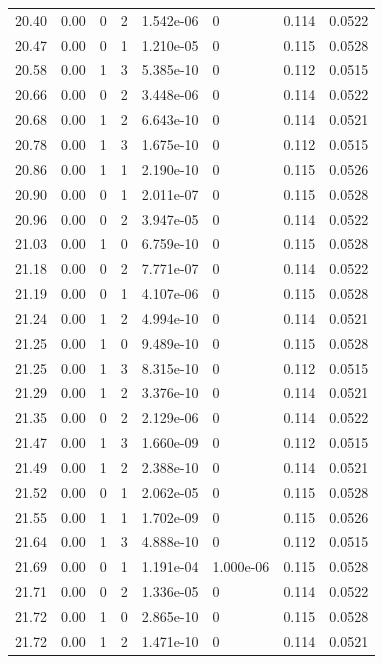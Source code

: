 \documentclass[preview]{standalone}
\begin{document}
{{{{{{{{\begin{tabular}{L{1.2cm}C{1.2cm} C{0.3cm}C{0.5cm} C{1.4cm}C{1.4cm} C{1.4cm}C{1.4cm}}
  20.40  &  0.00  & 0     &  2 &  1.542e-06  & 0  & 0.114 &  0.0522   \\ 
  20.47  &  0.00  & 0     &  1 &  1.210e-05  & 0  & 0.115 &  0.0528   \\ 
  20.58  &  0.00  & 1     &  3 &  5.385e-10  & 0  & 0.112 &  0.0515   \\ 
  20.66  &  0.00  & 0     &  2 &  3.448e-06  & 0  & 0.114 &  0.0522   \\ 
  20.68  &  0.00  & 1     &  2 &  6.643e-10  & 0  & 0.114 &  0.0521   \\ 
  20.78  &  0.00  & 1     &  3 &  1.675e-10  & 0  & 0.112 &  0.0515   \\ 
  20.86  &  0.00  & 1     &  1 &  2.190e-10  & 0  & 0.115 &  0.0526   \\ 
  20.90  &  0.00  & 0     &  1 &  2.011e-07  & 0  & 0.115 &  0.0528   \\ 
  20.96  &  0.00  & 0     &  2 &  3.947e-05  & 0  & 0.114 &  0.0522   \\ 
  21.03  &  0.00  & 1     &  0 &  6.759e-10  & 0  & 0.115 &  0.0528   \\ 
  21.18  &  0.00  & 0     &  2 &  7.771e-07  & 0  & 0.114 &  0.0522   \\ 
  21.19  &  0.00  & 0     &  1 &  4.107e-06  & 0  & 0.115 &  0.0528   \\ 
  21.24  &  0.00  & 1     &  2 &  4.994e-10  & 0  & 0.114 &  0.0521   \\ 
  21.25  &  0.00  & 1     &  0 &  9.489e-10  & 0  & 0.115 &  0.0528   \\ 
  21.25  &  0.00  & 1     &  3 &  8.315e-10  & 0  & 0.112 &  0.0515   \\ 
  21.29  &  0.00  & 1     &  2 &  3.376e-10  & 0  & 0.114 &  0.0521   \\ 
  21.35  &  0.00  & 0     &  2 &  2.129e-06  & 0  & 0.114 &  0.0522   \\ 
  21.47  &  0.00  & 1     &  3 &  1.660e-09  & 0  & 0.112 &  0.0515   \\ 
  21.49  &  0.00  & 1     &  2 &  2.388e-10  & 0  & 0.114 &  0.0521   \\ 
  21.52  &  0.00  & 0     &  1 &  2.062e-05  & 0  & 0.115 &  0.0528   \\ 
  21.55  &  0.00  & 1     &  1 &  1.702e-09  & 0  & 0.115 &  0.0526   \\ 
  21.64  &  0.00  & 1     &  3 &  4.888e-10  & 0  & 0.112 &  0.0515   \\ 
  21.69  &  0.00  & 0     &  1 &  1.191e-04  & 1.000e-06  & 0.115 &  0.0528   \\ 
  21.71  &  0.00  & 0     &  2 &  1.336e-05  & 0  & 0.114 &  0.0522   \\ 
  21.72  &  0.00  & 1     &  0 &  2.865e-10  & 0  & 0.115 &  0.0528   \\ 
  21.72  &  0.00  & 1     &  2 &  1.471e-10  & 0  & 0.114 &  0.0521   \\ 
\hline 
\end{tabular} 

}}}}}}}}
\end{document}

